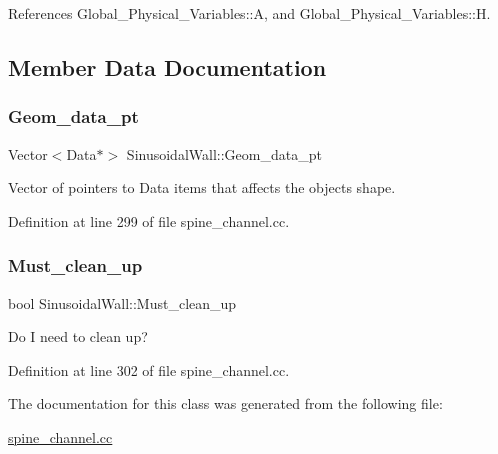 References Global\+\_\+\+Physical\+\_\+\+Variables\+::A, and Global\+\_\+\+Physical\+\_\+\+Variables\+::H.



\subsection{Member Data Documentation}
\mbox{\label{classSinusoidalWall_a1d8226424f058dff0234e65a6e288a39}} 
\subsubsection{\texorpdfstring{Geom\+\_\+data\+\_\+pt}{Geom\_data\_pt}}
{\footnotesize\ttfamily Vector$<$Data$\ast$$>$ Sinusoidal\+Wall\+::\+Geom\+\_\+data\+\_\+pt\hspace{0.3cm}{\ttfamily [private]}}



Vector of pointers to Data items that affects the object\textquotesingle{}s shape. 



Definition at line 299 of file spine\+\_\+channel.\+cc.

\mbox{\label{classSinusoidalWall_ad89b819030680f489135376a8abc9f05}} 
\subsubsection{\texorpdfstring{Must\+\_\+clean\+\_\+up}{Must\_clean\_up}}
{\footnotesize\ttfamily bool Sinusoidal\+Wall\+::\+Must\+\_\+clean\+\_\+up\hspace{0.3cm}{\ttfamily [private]}}



Do I need to clean up? 



Definition at line 302 of file spine\+\_\+channel.\+cc.



The documentation for this class was generated from the following file\+:\begin{DoxyCompactItemize}
\item 
\hyperlink{spine__channel_8cc}{spine\+\_\+channel.\+cc}\end{DoxyCompactItemize}
